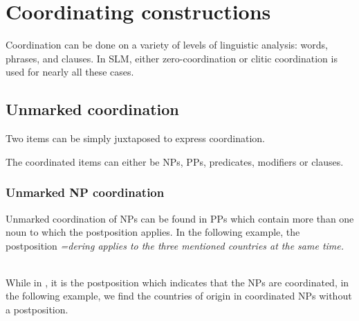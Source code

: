 \section{Coordinating constructions}\label{sec:constr:Coordinatingconstructions}
Coordination can be done on a variety of levels of linguistic analysis: words, phrases, and clauses. In SLM, either zero-coordination  or clitic coordination  is used  for nearly all these cases.

\subsection{Unmarked coordination}\label{sec:constr:Unmarkedcoordination}
Two items can be simply juxtaposed to express coordination.


The coordinated items can either be  NPs, PPs, predicates, modifiers or clauses.


\subsubsection[NP]{Unmarked NP coordination}\label{sec:constr:UnmarkedNPcoordination}
Unmarked coordination of NPs can be found in PPs which contain more than one noun to which the postposition applies. In the following example, the postposition \em =dering \em applies to the three mentioned countries at the same time.

 \\ 


While in , it is the postposition which indicates that the NPs are coordinated, in the following example, we find the countries of origin in  coordinated NPs without a postposition.

 \\

